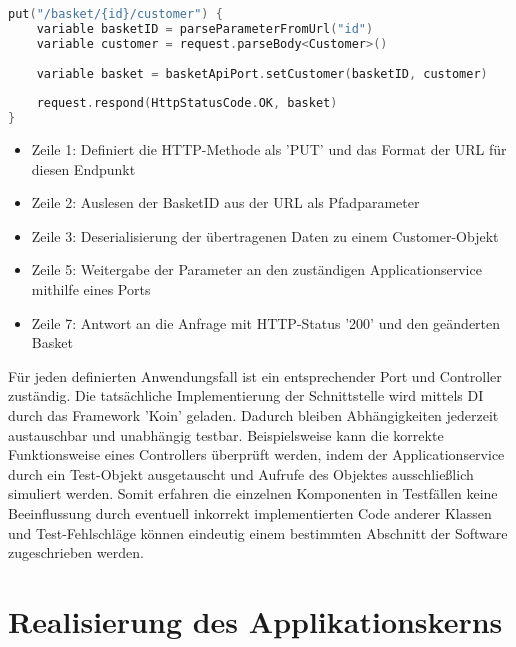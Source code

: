 \vspace{0.5cm}
\begin{minipage}{\linewidth} %
\begin{lstlisting}[caption={Beispiel eines Controllers zum Aktualisieren von Kundendaten}, label={lst:controller}, language=Kotlin]
put("/basket/{id}/customer") {
	variable basketID = parseParameterFromUrl("id")
	variable customer = request.parseBody<Customer>() 
	
	variable basket = basketApiPort.setCustomer(basketID, customer)
	
	request.respond(HttpStatusCode.OK, basket)
}
\end{lstlisting}

\begin{itemize}
	\setlength\itemsep{-1pt}
	\item Zeile 1: Definiert die HTTP-Methode als 'PUT' und das Format der URL für diesen Endpunkt
	\item Zeile 2: Auslesen der BasketID aus der URL als Pfadparameter
	\item Zeile 3: Deserialisierung der übertragenen Daten zu einem Customer-Objekt
	\item Zeile 5: Weitergabe der Parameter an den zuständigen Applicationservice mithilfe eines Ports
	\item Zeile 7: Antwort an die Anfrage mit HTTP-Status '200' und den geänderten Basket
\end{itemize}
\end{minipage}

\pagebreak

Für jeden definierten Anwendungsfall ist ein entsprechender Port und Controller zuständig. Die tatsächliche Implementierung der Schnittstelle wird mittels \Gls{DI} durch das Framework 'Koin' geladen. Dadurch bleiben Abhängigkeiten jederzeit austauschbar und unabhängig testbar. Beispielsweise kann die korrekte Funktionsweise eines Controllers überprüft werden, indem der Applicationservice durch ein Test-Objekt ausgetauscht und Aufrufe des Objektes ausschließlich simuliert werden. Somit erfahren die einzelnen Komponenten in Testfällen keine Beeinflussung durch eventuell inkorrekt implementierten Code anderer Klassen und Test-Fehlschläge können eindeutig einem bestimmten Abschnitt der Software zugeschrieben werden. \cite{DI_2007, Lindooren.2007}

\section{Realisierung des Applikationskerns}

